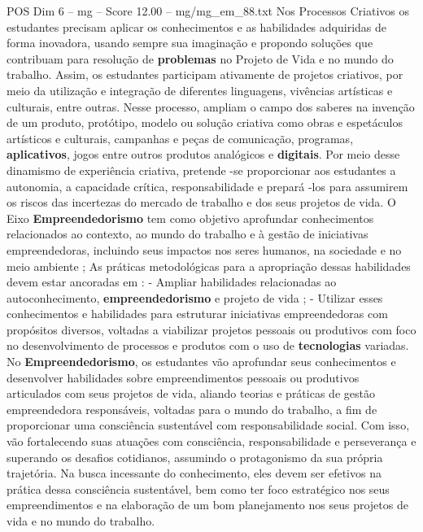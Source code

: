 \begin{textsample}{POS Dim 6 – mg – Score 12.00 – mg/mg\_em\_88.txt}
Nos Processos Criativos os estudantes precisam aplicar os conhecimentos e as habilidades adquiridas de forma inovadora, usando sempre sua imaginação e propondo soluções que contribuam para resolução de \textbf{problemas} no Projeto de Vida e no mundo do trabalho.
Assim, os estudantes participam ativamente de projetos criativos, por meio da utilização e integração de diferentes linguagens, vivências artísticas e culturais, entre outras.
Nesse processo, ampliam o campo dos saberes na invenção de um produto, protótipo, modelo ou solução criativa como obras e espetáculos artísticos e culturais, campanhas e peças de comunicação, programas, \textbf{aplicativos}, jogos entre outros produtos analógicos e \textbf{digitais}.
Por meio desse dinamismo de experiência criativa, pretende -se proporcionar aos estudantes a autonomia, a capacidade crítica, responsabilidade e prepará -los para assumirem os riscos das incertezas do mercado de trabalho e dos seus projetos de vida.
O Eixo \textbf{Empreendedorismo} tem como objetivo aprofundar conhecimentos relacionados ao contexto, ao mundo do trabalho e à gestão de iniciativas empreendedoras, incluindo seus impactos nos seres humanos, na sociedade e no meio ambiente ; As práticas metodológicas para a apropriação dessas habilidades devem estar ancoradas em : - Ampliar habilidades relacionadas ao autoconhecimento, \textbf{empreendedorismo} e projeto de vida ; - Utilizar esses conhecimentos e habilidades para estruturar iniciativas empreendedoras com propósitos diversos, voltadas a viabilizar projetos pessoais ou produtivos com foco no desenvolvimento de processos e produtos com o uso de \textbf{tecnologias} variadas.
No \textbf{Empreendedorismo}, os estudantes vão aprofundar seus conhecimentos e desenvolver habilidades sobre empreendimentos pessoais ou produtivos articulados com seus projetos de vida, aliando teorias e práticas de gestão empreendedora responsáveis, voltadas para o mundo do trabalho, a fim de proporcionar uma consciência sustentável com responsabilidade social.
Com isso, vão fortalecendo suas atuações com consciência, responsabilidade e perseverança e superando os desafios cotidianos, assumindo o protagonismo da sua própria trajetória.
Na busca incessante do conhecimento, eles devem ser efetivos na prática dessa consciência sustentável, bem como ter foco estratégico nos seus empreendimentos e na elaboração de um bom planejamento nos seus projetos de vida e no mundo do trabalho.

\end{textsample}
